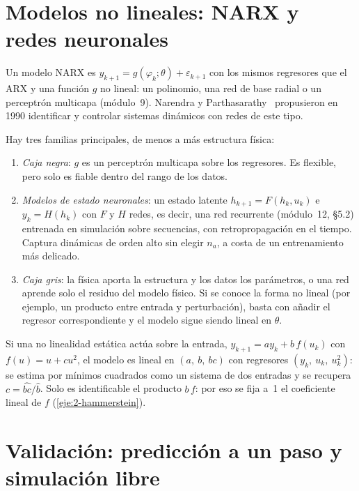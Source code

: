 \section{Modelos no lineales: NARX y redes neuronales}

\begin{definicion}\label{def:narx}
Un modelo NARX es $y_{k+1}=g(\varphi_k;\theta)+\varepsilon_{k+1}$ con los mismos regresores que el ARX y una función $g$ no lineal: un polinomio, una red de base radial o un perceptrón multicapa (módulo~9). Narendra y Parthasarathy~\cite{narendra} propusieron en 1990 identificar y controlar sistemas dinámicos con redes de este tipo.
\end{definicion}

Hay tres familias principales, de menos a más estructura física:
\begin{enumerate}
  \item \emph{Caja negra}: $g$ es un perceptrón multicapa sobre los regresores. Es flexible, pero solo es fiable dentro del rango de los datos.
  \item \emph{Modelos de estado neuronales}: un estado latente $h_{k+1}=F(h_k,u_k)$ e $y_k=H(h_k)$ con $F$ y $H$ redes, es decir, una red recurrente (módulo~12, §5.2) entrenada en simulación sobre secuencias, con retropropagación en el tiempo. Captura dinámicas de orden alto sin elegir $n_a$, a costa de un entrenamiento más delicado.
  \item \emph{Caja gris}: la física aporta la estructura y los datos los parámetros, o una red aprende solo el residuo del modelo físico. Si se conoce la forma no lineal (por ejemplo, un producto entre entrada y perturbación), basta con añadir el regresor correspondiente y el modelo sigue siendo lineal en $\theta$.
\end{enumerate}

\begin{ejemplo}\label{ej:hammerstein}
Si una no linealidad estática actúa sobre la entrada, $y_{k+1}=ay_k+b\,f(u_k)$ con $f(u)=u+cu^{2}$, el modelo es lineal en $(a,\ b,\ bc)$ con regresores $(y_k,\ u_k,\ u_k^{2})$: se estima por mínimos cuadrados como un sistema de dos entradas y se recupera $c=\widehat{bc}/\hat b$. Solo es identificable el producto $b\,f$: por eso se fija a~1 el coeficiente lineal de $f$ (\cref{eje:2-hammerstein}).
\end{ejemplo}

\section{Validación: predicción a un paso y simulación libre}

